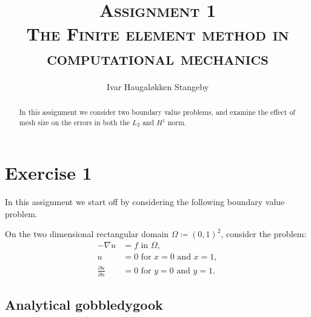 \documentclass[]{article}
\title{\textsc{Assignment 1 \\ The Finite element method in computational mechanics}}
\author{Ivar Haugaløkken Stangeby}
\begin{document}
\maketitle    

\begin{abstract}
    In this assignment we consider two boundary value problems, and examine the
    effect of mesh size on the errors in both the $L_2$ and $H^1$ norm.
\end{abstract}

\section*{Exercise 1}
\label{sec:formulation_of_problem}

In this assignment we start off by considering the following boundary value
problem.

\begin{BVP}
    \label{bvp:one}
    On the two dimensional rectangular domain $\Omega \coloneqq (0, 1)^2$, consider the
    problem:
    \begin{align}
        \label{eq:problem}
        -\nabla u &= f \text{ in } \Omega,\\ 
        u &= 0 \text{ for } x = 0 \text{ and } x = 1,\\
        \frac{\partial u}{\partial n} &= 0 \text{ for } y = 0 \text{ and } y = 1.
    \end{align}
\end{BVP}

\subsection*{Analytical gobbledygook}
\label{sub:analytical_}
\end{document}
